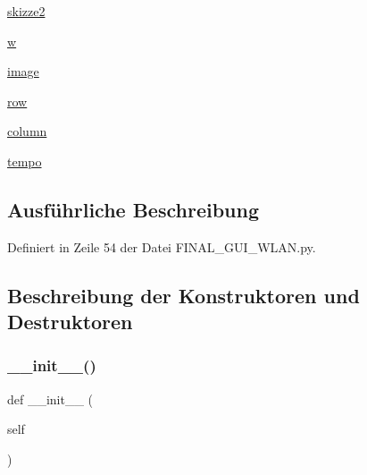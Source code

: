 \begin{DoxyCompactItemize}
\hyperlink{class_f_i_n_a_l___g_u_i___w_l_a_n_1_1_w_l_a_n_a13e05c23070254bbd95f7667de8adecf}{skizze2}
\item 
\hyperlink{class_f_i_n_a_l___g_u_i___w_l_a_n_1_1_w_l_a_n_aad57484016654da87125db86f4227ea3}{w}
\item 
\hyperlink{class_f_i_n_a_l___g_u_i___w_l_a_n_1_1_w_l_a_n_a42cb5f5737262947250c709931232c69}{image}
\item 
\hyperlink{class_f_i_n_a_l___g_u_i___w_l_a_n_1_1_w_l_a_n_ad42e2d1ad172100a2cd1338656cf0425}{row}
\item 
\hyperlink{class_f_i_n_a_l___g_u_i___w_l_a_n_1_1_w_l_a_n_ae78e6e11a40e6dba1bae097358f97d15}{column}
\item 
\hyperlink{class_f_i_n_a_l___g_u_i___w_l_a_n_1_1_w_l_a_n_abcb81551865db00b5956bda4b5f1d1fc}{tempo}
\end{DoxyCompactItemize}


\subsection{Ausführliche Beschreibung}


Definiert in Zeile 54 der Datei F\+I\+N\+A\+L\+\_\+\+G\+U\+I\+\_\+\+W\+L\+A\+N.\+py.



\subsection{Beschreibung der Konstruktoren und Destruktoren}
\mbox{\label{class_f_i_n_a_l___g_u_i___w_l_a_n_1_1_w_l_a_n_ae64f0875afe3067b97ba370b354b9213}} 
\subsubsection{\texorpdfstring{\+\_\+\+\_\+init\+\_\+\+\_\+()}{\_\_init\_\_()}}
{\footnotesize\ttfamily def \+\_\+\+\_\+init\+\_\+\+\_\+ (\begin{DoxyParamCaption}\item[{}]{self }\end{DoxyParamCaption})}




